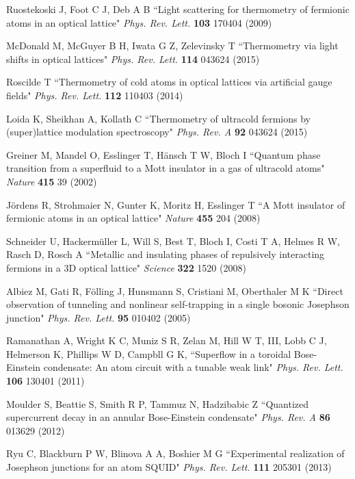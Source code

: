 \documentclass[pra,letterpaper,twocolumn,showpacs,superscriptaddress]{revtex4}
\begin{document}
\begin{thebibliography}{300}
 Ruostekoski J, Foot C J, Deb A B 
``Light scattering for thermometry of fermionic atoms in an optical lattice"
{\it Phys. Rev. Lett.} \textbf{103} 170404 (2009)

 McDonald M, McGuyer B H, Iwata G Z, Zelevinsky T
``Thermometry via light shifts in optical lattices"
{\it Phys. Rev. Lett.} \textbf{114} 043624 (2015)

 Roscilde T
``Thermometry of cold atoms in optical lattices via artificial gauge fields"
{\it Phys. Rev. Lett.} \textbf{112} 110403 (2014)

 Loida K, Sheikhan A, Kollath C 
``Thermometry of ultracold fermions by (super)lattice modulation spectroscopy"
{\it Phys. Rev. A} \textbf{92} 043624 (2015)

 Greiner M, Mandel O, Esslinger T, H\"ansch T W, Bloch I 
``Quantum phase transition from a superfluid to a Mott insulator in a gas of ultracold atoms"
{\it Nature} \textbf{415} 39 (2002)

 J\"ordens R, Strohmaier N, Gunter K, Moritz H, Esslinger T 
``A Mott insulator of fermionic atoms in an optical lattice" {\it Nature} \textbf{455} 204 (2008)
 
 Schneider U, Hackerm\"uller L, Will S, Best T, Bloch I, Costi T A, Helmes R W, Rasch D, Rosch A
``Metallic and insulating phases of repulsively interacting fermions in a 3D optical lattice"
{\it Science} \textbf{322} 1520 (2008)

 Albiez M, Gati R, F\"olling J, Hunsmann S, Cristiani M, Oberthaler M K 
``Direct observation of tunneling and nonlinear self-trapping in a single bosonic Josephson junction"
{\it Phys. Rev. Lett.} \textbf{95} 010402 (2005)

 Ramanathan A, Wright K C, Muniz S R, Zelan M, Hill W T, III, Lobb C J, Helmerson K, Phillips W D, Campbll G K,
``Superflow in a toroidal Bose-Einstein condensate: An atom circuit with a tunable weak link"
{\it Phys. Rev. Lett.} \textbf{106} 130401 (2011)

 Moulder S, Beattie S, Smith R P, Tammuz N, Hadzibabic Z
``Quantized supercurrent decay in an annular Bose-Einstein condensate"
{\it Phys. Rev. A} \textbf{86} 013629 (2012)

 Ryu C, Blackburn P W, Blinova A A, Boshier M G 
``Experimental realization of Josephson junctions for an atom SQUID"
{\it Phys. Rev. Lett.} \textbf{111} 205301 (2013)


\end{thebibliography}
\end{document}
